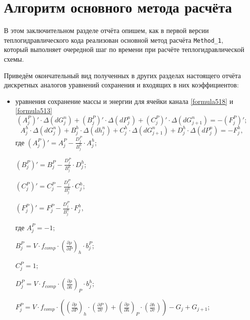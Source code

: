 
\section{Алгоритм основного метода расчёта}
\label{sec:section8}
В этом заключительном разделе отчёта опишем, как в первой версии теплогидравлического кода реализован основной метод расчёта \texttt{Method\_1}, который выполняет очередной шаг по времени при расчёте теплогидравлической схемы.

Приведём окончательный вид полученных в других разделах настоящего отчёта дискретных аналогов уравнений сохранения и входящих в них коэффициентов:
\begin{itemize}[topsep=5pt, itemsep=-3pt]
\item уравнения сохранение массы и энергии для ячейки канала \eqref{formula518} и \eqref{formula513}
$$
\left(A_j^P \right)' \cdot \Delta(dG_{j}^n) + \left(B_j^P \right)' \cdot \Delta(dP_j^n) + \left(C_j^P \right)' \cdot \Delta(dG_{j+1}^n) = -\left(F_j^P \right)';
$$
$$
A_j^h \cdot \Delta(dG_{j}^n)+B_j^h \cdot \Delta(dh_j^n) + C_j^h \cdot \Delta(dG_{j+1}^n) + D_j^h \cdot \Delta(dP_j^n) = -F_j^h,
$$
где $\left(A_j^P \right)'=A_j^P - \frac{D_j^P}{B_j^h} \cdot A_j^h$;

\noindent \hspace{0.6cm} $\left(B_j^P \right)'=B_j^P - \frac{D_j^P}{B_j^h} \cdot D_j^h$;

\noindent \hspace{0.6cm} $\left(C_j^P \right)'=C_j^P - \frac{D_j^P}{B_j^h} \cdot C_j^h$;

\noindent \hspace{0.6cm} $\left(F_j^P \right)'=F_j^P - \frac{D_j^P}{B_j^h} \cdot F_j^h$,

\noindent где $A_j^P=-1$;

\noindent \hspace{0.6cm} $B_j^P=V \cdot f_{comp}\cdot \left( \frac{\partial\rho}{\partial P}\right)_{h} \cdot b_j^P$;

\noindent \hspace{0.6cm} $C_j^P=1$;

\noindent \hspace{0.6cm} $D_j^P=V \cdot f_{comp}\cdot \left(\frac{\partial\rho}{\partial h}\right)_{P} \cdot b_j^h$;

\noindent \hspace{0.6cm} $F_j^P=V\cdot f_{comp} \cdot \left(\left(\frac{\partial\rho}{\partial P}\right)_{h}\cdot \left(\frac{\partial P}{\partial\tau} \right) + \left(\frac{\partial\rho}{\partial h}\right)_{P}\cdot \left(\frac{\partial h}{\partial\tau} \right) \right) - G_j + G_{j+1}$;


\end{itemize}
